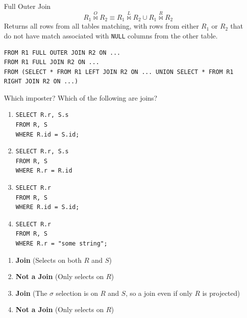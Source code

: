 \begin{definitionbox}{Full Outer Join}
    \[R_1 \overset{O}{\bowtie} R_2 \equiv R_1 \overset{L}{\bowtie} R_2 \cup R_1 \overset{R}{\bowtie} R_2\]
    Returns all rows from all tables matching, with rows from either $R_1$ or $R_2$ that do not have match associated with \texttt{NULL} columns from the other table.
    \begin{center}
    \end{center}
    \begin{verbatim}
FROM R1 FULL OUTER JOIN R2 ON ... 
FROM R1 FULL JOIN R2 ON ... 
FROM (SELECT * FROM R1 LEFT JOIN R2 ON ... UNION SELECT * FROM R1 RIGHT JOIN R2 ON ...)
    \end{verbatim}
\end{definitionbox}


\begin{examplebox}{Which imposter?}
    Which of the following are joins?
    \begin{multicols}{2}
    \begin{enumerate}
        \item {
\begin{verbatim}
SELECT R.r, S.s
FROM R, S
WHERE R.id = S.id;
\end{verbatim}
}
\item {
    \begin{verbatim}
SELECT R.r, S.s
FROM R, S
WHERE R.r = R.id
    \end{verbatim}
}
        \item {
        \begin{verbatim}
SELECT R.r
FROM R, S
WHERE R.id = S.id;
        \end{verbatim}
        }
        \item {
            \begin{verbatim}
SELECT R.r
FROM R, S
WHERE R.r = "some string";
            \end{verbatim}
        }
    \end{enumerate}
    \end{multicols}
    \tcblower
    \begin{enumerate}
        \item \textbf{Join} (Selects on both $R$ and $S$)
        \item \textbf{Not a Join} (Only selects on $R$)
        \item \textbf{Join} (The $\sigma$ selection is on $R$ and $S$, so a join even if only $R$ is projected)
        \item \textbf{Not a Join} (Only selects on $R$)
    \end{enumerate}
\end{examplebox}

